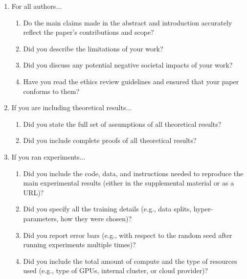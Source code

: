 \documentclass{article}
\begin{document}
\begin{enumerate}

  \item For all authors...
        \begin{enumerate}
          \item Do the main claims made in the abstract and introduction accurately reflect the paper's contributions and scope?
                \answerYes{}
          \item Did you describe the limitations of your work?
                \answerYes{}
          \item Did you discuss any potential negative societal impacts of your work?
                \answerYes{}
          \item Have you read the ethics review guidelines and ensured that your paper conforms to them?
                \answerYes{}
        \end{enumerate}


  \item If you are including theoretical results...
        \begin{enumerate}
          \item Did you state the full set of assumptions of all theoretical results?
                \answerNA{}
          \item Did you include complete proofs of all theoretical results?
                \answerNA{}
        \end{enumerate}


  \item If you ran experiments...
        \begin{enumerate}
          \item Did you include the code, data, and instructions needed to reproduce the main experimental results (either in the supplemental material or as a URL)?
                \answerYes{}
          \item Did you specify all the training details (e.g., data splits, hyper-parameters, how they were chosen)?
                \answerYes{}
          \item Did you report error bars (e.g., with respect to the random seed after running experiments multiple times)?
                \answerYes{}
          \item Did you include the total amount of compute and the type of resources used (e.g., type of GPUs, internal cluster, or cloud provider)?
                \answerYes{}
        \end{enumerate}



\end{enumerate}
\end{document}
